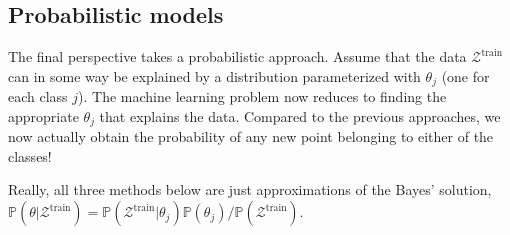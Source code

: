 \documentclass{article}
\begin{document}
\newpage
\subsection{Probabilistic models}
The final perspective takes a probabilistic approach. Assume that the data $\mathcal{Z}^\text{train}$ can in some way be explained by a distribution parameterized with $\theta_j$ (one for each class $j$). The machine learning problem now reduces to finding the appropriate $\theta_j$ that explains the data. Compared to the previous approaches, we now actually obtain the probability of any new point belonging to either of the classes!

Really, all three methods below are just approximations of the Bayes' solution, $\mathbb{P}(\theta|\mathcal{Z}^\text{train})=\mathbb{P}(\mathcal{Z}^\text{train}|\theta_j)\mathbb{P}(\theta_j)/\mathbb{P}(\mathcal{Z}^\text{train})$.
\end{document}
